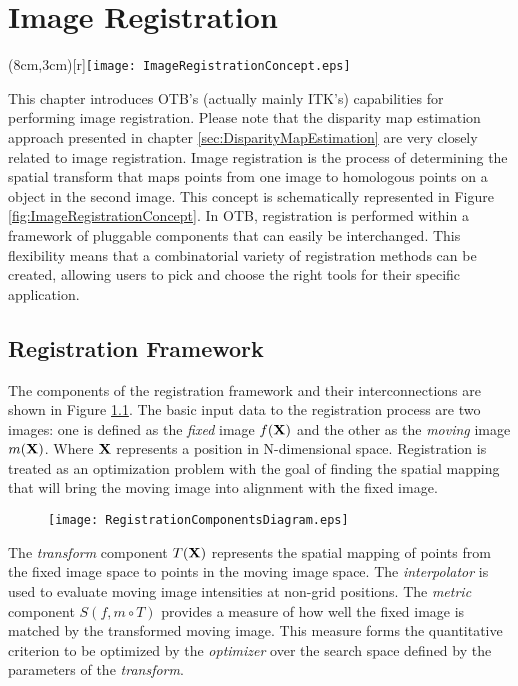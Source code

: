 \chapter{Image Registration}

\parpic(8cm,3cm)[r]{\texttt{[image: ImageRegistrationConcept.eps]}}
  
This chapter introduces OTB's (actually mainly ITK's) capabilities for performing image
registration. Please note that the disparity map estimation approach
presented in chapter \ref{sec:DisparityMapEstimation} are very closely
related to image registration. Image registration is the process of
determining the spatial transform that maps points from one image to
homologous points on a object in the second image. This concept is
schematically represented in Figure
\ref{fig:ImageRegistrationConcept}. In OTB, registration is performed
within a framework of pluggable components that can easily be
interchanged.  This flexibility means that a combinatorial variety of
registration methods can be created, allowing users to pick and choose
the right tools for their specific application.


\section{Registration Framework}
The components of the registration framework and their interconnections are
shown in Figure \ref{fig:RegistrationComponents}. The basic input data to the
registration process are two images: one is defined as the \emph{fixed} image
$f(\bf{X})$ and the other as the \emph{moving} image $m(\bf{X})$. Where
$\bf{X}$ represents a position in N-dimensional space. Registration is treated
as an optimization problem with the goal of finding the spatial mapping that
will bring the moving image into alignment with the fixed image.

\begin{figure}
\center
\texttt{[image: RegistrationComponentsDiagram.eps]}
\label{fig:RegistrationComponents}
\end{figure}

The \emph{transform} component $T(\bf{X})$ represents the spatial mapping of
points from the fixed image space to points in the moving image space. The
\emph{interpolator} is used to evaluate moving image intensities at non-grid
positions. The \emph{metric} component $S(f,m \circ T)$ provides a measure of
how well the fixed image is matched by the transformed moving image. This
measure forms the quantitative criterion to be optimized by the
\emph{optimizer} over the search space defined by the parameters of the
\emph{transform}.

